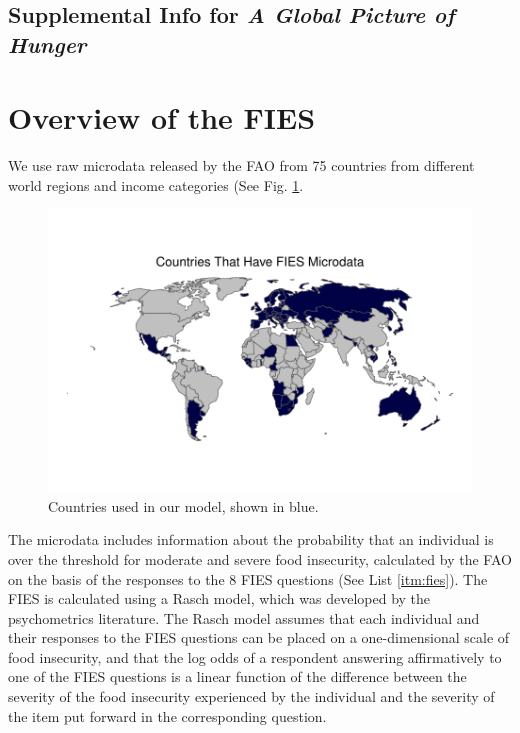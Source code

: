 \documentclass{article}
\begin{document}
\begin{center}
\section*{Supplemental Info for \textit{A Global Picture of Hunger}}
\end{center}
\setcounter{table}{0}
\setcounter{figure}{0}
\setcounter{section}{0}
\renewcommand{\thetable}{S\arabic{table}}
\renewcommand{\thefigure}{S\arabic{figure}}
\renewcommand{\thesection}{S\arabic{section}}

\section{Overview of the FIES}
We use raw microdata released by the FAO from 75 countries from different world regions and income categories (See Fig. \ref{fig:fies_countries}.

\begin{figure}[H]
  \centering
  \includegraphics[width=\linewidth]{img/FIES_Countries.pdf}
  \caption{Countries used in our model, shown in blue.}
  \label{fig:fies_countries}
\end{figure}

The microdata includes information about the probability that an individual is over the threshold for moderate and severe food insecurity, calculated by the FAO on the basis of the responses to the 8 FIES questions (See List \ref{itm:fies}).  The FIES is calculated using a Rasch model, which was developed by the psychometrics literature.  The Rasch model assumes that each individual and their responses to the FIES questions can be placed on a one-dimensional scale of food insecurity, and that the log odds of a respondent answering affirmatively to one of the FIES questions is a linear function of the difference between the severity of the food insecurity experienced by the individual and the severity of the item put forward in the corresponding question.
\end{document}
